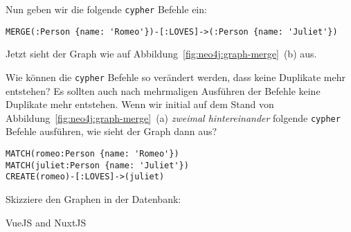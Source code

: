 \documentclass[
addpoints,a4paper,ngerman,answers
]{exam}
\begin{document}
\begin{questions}
\begin{parts}
  \newpage
  Nun geben wir die folgende \texttt{cypher} Befehle ein:
  \begin{lstlisting}
MERGE(:Person {name: 'Romeo'})-[:LOVES]->(:Person {name: 'Juliet'})
  \end{lstlisting}


  Jetzt sieht der Graph wie auf Abbildung~\ref{fig:neo4j:graph-merge}~(b) aus.
  \begin{subparts}
    \subpart[1]
    Wie können die \texttt{cypher} Befehle so verändert werden, dass keine
    Duplikate mehr entstehen? Es sollten auch nach mehrmaligen Ausführen der
    Befehle keine Duplikate mehr entstehen.
    \makeemptybox{14em}
    \subpart[2]
    Wenn wir initial auf dem Stand von Abbildung~\ref{fig:neo4j:graph-merge}~(a)
    \emph{zweimal hintereinander} folgende \texttt{cypher} Befehle ausführen,
    wie sieht der Graph dann aus?
    \begin{lstlisting}
MATCH(romeo:Person {name: 'Romeo'})
MATCH(juliet:Person {name: 'Juliet'})
CREATE(romeo)-[:LOVES]->(juliet)
    \end{lstlisting}
    Skizziere den Graphen in der Datenbank:
    \makeemptybox{14em}
  \end{subparts}
\end{parts}

\clearpage

\question VueJS and NuxtJS
\end{questions}
\end{document}
